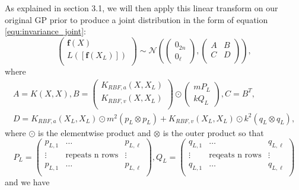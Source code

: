 \documentclass{statsmsc}
\begin{document}
As explained in section 3.1, we will then apply this linear transform on our original GP prior to produce a joint distribution in the form of equation \ref{equ:invariance_joint}:
\begin{equation}
\begin{pmatrix}
    \mathbf{f}(X)\\
    L([\mathbf{f}(X_L)])\\
\end{pmatrix}
\sim\mathcal{N}
\left(\begin{pmatrix}
    0_{2n}\\0_{\ell}
\end{pmatrix},\begin{pmatrix}
   A & B \\
   C & D\\ 
\end{pmatrix}\right),
\label{equ:jointABCD}
\end{equation}
where
\begin{equation}
\begin{gathered}
A=K(X,X), B=\begin{pmatrix}
    K_{RBF,a}(X, X_L) \\ K_{RBF,v}(X, X_L) \\
\end{pmatrix}\odot \begin{pmatrix}
    mP_L \\ kQ_L
\end{pmatrix}, C=B^T,\\ D=K_{RBF,a}(X_L, X_L)\odot m^2(p_L\otimes p_L) + K_{RBF,v}(X_L, X_L)\odot k^2(q_L\otimes q_L),
\end{gathered}
\label{equ:ABCD}
\end{equation}
where $\odot$ is the elementwise product and $\otimes$ is the outer product so that 
$$
P_L=\begin{pmatrix}
  p_{L,1}  & \dots & p_{L,\ell}  \\
  \vdots & \text{repeats n rows} &  \vdots\\
  p_{L,1}  & \dots & p_{L,\ell}  \\
\end{pmatrix},
Q_L=\begin{pmatrix}
  q_{L,1}  & \dots & q_{L,\ell}  \\
  \vdots & \text{reqeats n rows} &  \vdots\\
  q_{L,1}  & \dots & q_{L,\ell}  \\
\end{pmatrix}
$$
and we have 
\end{document}
